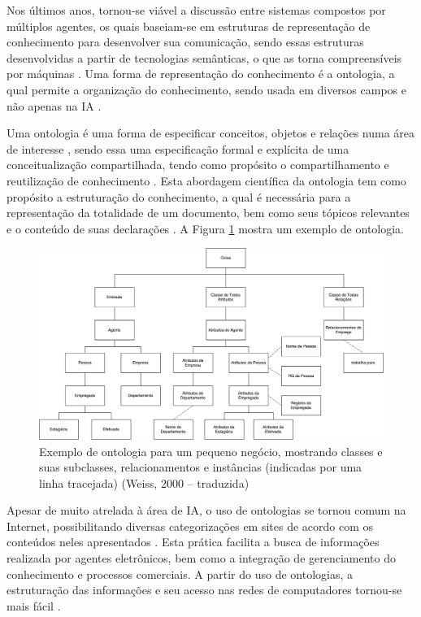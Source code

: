 Nos últimos anos, tornou-se viável a discussão entre sistemas compostos por múltiplos agentes, os quais baseiam-se em estruturas de representação de conhecimento para desenvolver sua comunicação, sendo essas estruturas desenvolvidas a partir de tecnologias semânticas, o que as torna compreensíveis por máquinas \cite{godert2014}. Uma forma de representação do conhecimento é a ontologia, a qual permite a organização do conhecimento, sendo usada em diversos campos e não apenas na IA \cite{ONTOLOGIAI}.

Uma  ontologia  é  uma  forma  de  especificar  conceitos,  objetos  e  relações  numa área de interesse \cite{WEISS1999}, sendo essa uma especificação formal e explícita de uma conceitualização compartilhada, tendo como propósito o compartilhamento e reutilização de conhecimento \cite{UFG2007}.  Esta abordagem científica da ontologia tem como propósito a estruturação do conhecimento, a qual é necessária para a representação da totalidade de um documento, bem como seus tópicos relevantes e o conteúdo de suas declarações \cite{godert2014}. A Figura \ref{fig:ontologia} mostra um exemplo de ontologia.

\begin{figure}[H]
    \centering
    \caption[Exemplo de Ontologia]{\label{fig:ontologia}Exemplo de ontologia para um pequeno negócio, mostrando classes e suas subclasses, relacionamentos e instâncias (indicadas por uma linha tracejada) (Weiss, 2000 -- traduzida)}
    \includegraphics[width=1\textwidth]{pdf/ontology-weiss.pdf}
\end{figure}

Apesar de muito atrelada à área de IA, o uso de ontologias se tornou comum na Internet, possibilitando diversas categorizações em sites de acordo com os conteúdos neles apresentados \cite{NOY2001}. Esta prática facilita a busca de informações realizada por agentes eletrônicos, bem como a integração de gerenciamento do conhecimento e processos comerciais. A partir do uso de ontologias, a estruturação das informações e seu acesso nas redes de computadores tornou-se mais fácil \cite{MAEDCHE2002}.


